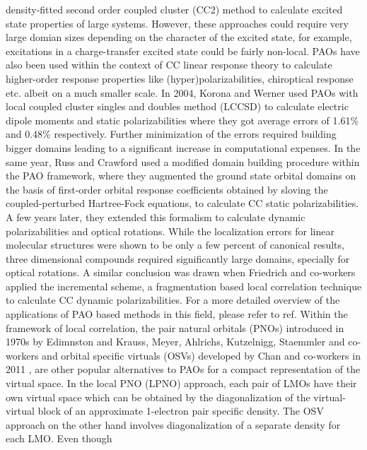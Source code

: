 density-fitted second order coupled cluster (CC2) \cite{} method to calculate excited state properties of 
large systems.\cite{} However, these approaches could require very large domian sizes depending on the 
character of the excited state, for example, excitations in a charge-transfer excited state could be 
fairly non-local. PAOs have also been used within the context of CC linear response theory to calculate 
higher-order response properties like (hyper)polarizabilities, chiroptical response etc. albeit on a 
much smaller scale.\cite{} In 2004, Korona and Werner\cite{} used PAOs with local coupled cluster singles 
and doubles method (LCCSD) to calculate electric dipole moments and static polarizabilities where they got 
average errors of 1.61\% and 0.48\% respectively. Further minimization of the errors required building bigger 
domains leading to a significant increase in computational expenses. In the same year, Russ and Crawford\cite{} 
used a modified domain building procedure within the PAO framework, where they augmented the ground state 
orbital domains on the basis of first-order orbital response coefficients obtained by sloving the coupled-perturbed 
Hartree-Fock equations, to calculate CC static polarizabilities. A few years later, they extended this 
formalism to calculate dynamic polarizabilities and optical rotations\cite{}. While the localization errors 
for linear molecular structures were shown to be only a few percent of canonical results, three dimensional 
compounds required significantly large domains, specially for optical rotations. A similar conclusion was drawn 
when Friedrich and co-workers applied the incremental scheme, a fragmentation based local correlation technique 
to calculate CC dynamic polarizabilities.\cite{} For a more detailed overview of the applications of PAO based 
methods in this field, please refer to ref\cite{McAlexander15}. Within the framework of local correlation, 
the pair natural orbitals (PNOs) introduced in 1970s by Edimnston and Krauss\cite{}, Meyer\cite{}, Ahlrichs\cite{}, 
Kutzelnigg\cite{}, Staemmler and co-workers\cite{} and orbital specific virtuals (OSVs) developed by Chan and 
co-workers in 2011 \cite{}, are other popular alternatives to PAOs for a compact representation of the virtual 
space. In the local PNO (LPNO) approach, each pair of LMOs have their own virtual space which can be obtained 
by the diagonalization of the virtual-virtual block of an approximate 1-electron pair specific density. 
The OSV approach on the other hand involves diagonalization of a separate density for each LMO. Even though 
